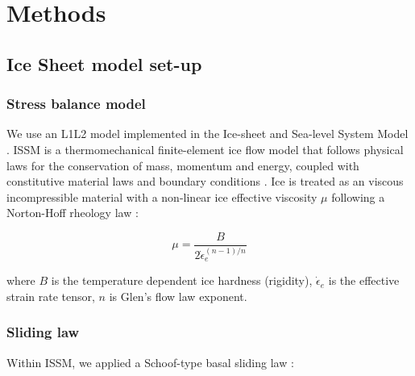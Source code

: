 \clearpage
\section{Methods} \label{sec:methods}

\subsection{Ice Sheet model set-up}


\subsubsection{Stress balance model}

We use an L1L2 model \citep{Hindmarshnumericalcomparisonapproximations2004,SchoofThinFilmFlowsWall2010} implemented in the Ice-sheet and Sea-level System Model \citep[\gls{ISSM}, v4.18;][]{LarourContinentalscalehigh2012}.
\gls{ISSM} is a thermomechanical finite-element ice flow model that follows physical laws for the conservation of mass, momentum and energy, coupled with constitutive material laws and boundary conditions \citep{LarourContinentalscalehigh2012}.
Ice is treated as an viscous incompressible material \citep{Cuffeyphysicsglaciers2010} with a non-linear ice effective viscosity $\mu$ following a Norton-Hoff rheology law \citep[Glen's flow law,][]{Glencreeppolycrystallineice1955}:

\begin{equation}
  \mu = \frac{B}{2 \dot{\epsilon}_e^{(n-1)/n}}
\end{equation}

where $B$ is the temperature dependent ice hardness (rigidity), $\dot{\epsilon}_e$ is the effective strain rate tensor, $n$ is Glen's flow law exponent.

\subsubsection{Sliding law}

Within \gls{ISSM}, we applied a Schoof-type basal sliding law \citep{Schoofeffectcavitationglacier2005}:


